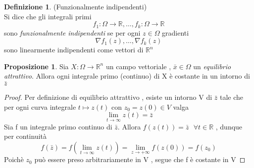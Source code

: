 \documentclass{article}
\theoremstyle{definition}
\newtheorem{definizione}{Definizione}[section]
\newtheorem*{proposizione}{Proposizione}
\newcommand{\R}{\mathbb{R}}
\newcommand{\Rn}{\R^n}
\begin{document}
 	\begin{definizione}(Funzionalmente indipendenti) \\
 		Si dice che gli integrali primi 
 		$$f_1  : \Omega \rightarrow \R , \dots ,f_k: \Omega \rightarrow \R$$ 
 	sono \textit{funzionalmente indipendenti} se per ogni $z \in \Omega$ gradienti 
 	$$\nabla f_1 (z) , \dots , \nabla f_k(z)$$ sono linearmente indipendenti come vettori di $\Rn$
 	\end{definizione}
 	\begin{proposizione}
 		Sia $X : \Omega \rightarrow \Rn$ un campo vettoriale , $\bar{x} \in \Omega$ un \textit{equilibrio attrattivo}. Allora ogni integrale primo (continuo) di X è costante in un intorno di $\bar{z}$
 	\end{proposizione}
 	\begin{proof}
 		Per definizione di equilibrio attrattivo , esiste un intorno V di $\bar{z}$ tale che per ogni curva integrale $t \mapsto z(t)$ con $z_0=z(0) \in V $ valga 
 		$$\lim_{t \rightarrow \infty}z(t)=\bar{z}$$ 
 		Sia f un integrale primo continuo di $\bar{z}$. Allora $f(z(t))=\bar{z} \ \ \ \forall t \in \R$ , dunque per continuità 
 		$$f(\bar{z})=f(\lim_{t \rightarrow \infty}z(t))=\lim_{z \rightarrow +\infty}f(z(0))=f(z_0)$$ 
 		Poichè $z_0$ può essere preso arbitrariamente in V , segue che f è costante in V 
 		 	\end{proof}
 		 	\newpage 
\end{document}

